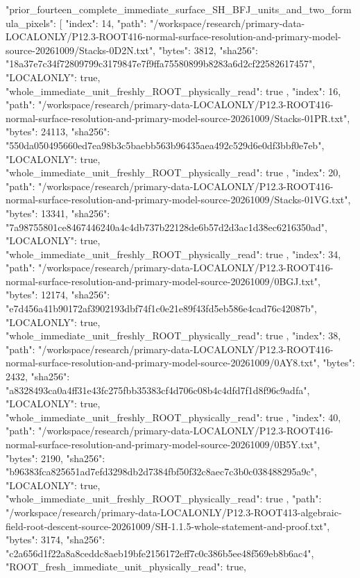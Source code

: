 \documentclass[11pt]{article}
\begin{document}
\begin{Full422Data}
{  "prior_fourteen_complete_immediate_surface_SH_BFJ_units_and_two_formula_pixels": [
    {
      "index": 14,
      "path": "/workspace/research/primary-data-LOCALONLY/P12.3-ROOT416-normal-surface-resolution-and-primary-model-source-20261009/Stacks-0D2N.txt",
      "bytes": 3812,
      "sha256": "18a37e7c34f72809799c3179847e7f9ffa75580899b8283a6d2cf22582617457",
      "LOCALONLY": true,
      "whole_immediate_unit_freshly_ROOT_physically_read": true
    },
    {
      "index": 16,
      "path": "/workspace/research/primary-data-LOCALONLY/P12.3-ROOT416-normal-surface-resolution-and-primary-model-source-20261009/Stacks-01PR.txt",
      "bytes": 24113,
      "sha256": "550da050495660ed7ea98b3c5baebb563b96435aea492c529d6e0df3bbf0e7eb",
      "LOCALONLY": true,
      "whole_immediate_unit_freshly_ROOT_physically_read": true
    },
    {
      "index": 20,
      "path": "/workspace/research/primary-data-LOCALONLY/P12.3-ROOT416-normal-surface-resolution-and-primary-model-source-20261009/Stacks-01VG.txt",
      "bytes": 13341,
      "sha256": "7a98755801ce8467446240a4c4db737b22128de6b57d2d3ac1d38ec6216350ad",
      "LOCALONLY": true,
      "whole_immediate_unit_freshly_ROOT_physically_read": true
    },
    {
      "index": 34,
      "path": "/workspace/research/primary-data-LOCALONLY/P12.3-ROOT416-normal-surface-resolution-and-primary-model-source-20261009/0BGJ.txt",
      "bytes": 12174,
      "sha256": "e7d456a41b90172af3902193dbf74f1c0e21e89f43fd5eb586e4cad76c42087b",
      "LOCALONLY": true,
      "whole_immediate_unit_freshly_ROOT_physically_read": true
    },
    {
      "index": 38,
      "path": "/workspace/research/primary-data-LOCALONLY/P12.3-ROOT416-normal-surface-resolution-and-primary-model-source-20261009/0AY8.txt",
      "bytes": 2432,
      "sha256": "a8328493ca0a4ff31e43fc275fbb35383cf4d706c08b4c4dfd7f1d8f96c9adfa",
      "LOCALONLY": true,
      "whole_immediate_unit_freshly_ROOT_physically_read": true
    },
    {
      "index": 40,
      "path": "/workspace/research/primary-data-LOCALONLY/P12.3-ROOT416-normal-surface-resolution-and-primary-model-source-20261009/0B5Y.txt",
      "bytes": 2190,
      "sha256": "b96383fca825651ad7efd3298db2d7384fbf50f32c8aec7c3b0c038488295a9c",
      "LOCALONLY": true,
      "whole_immediate_unit_freshly_ROOT_physically_read": true
    },
    {
      "path": "/workspace/research/primary-data-LOCALONLY/P12.3-ROOT413-algebraic-field-root-descent-source-20261009/SH-1.1.5-whole-statement-and-proof.txt",
      "bytes": 3174,
      "sha256": "c2a656d1f22a8a8ceddc8aeb19bfe2156172eff7c0c386b5ee48f569eb8b6ac4",
      "ROOT_fresh_immediate_unit_physically_read": true,
}}
\end{Full422Data}
\end{document}
